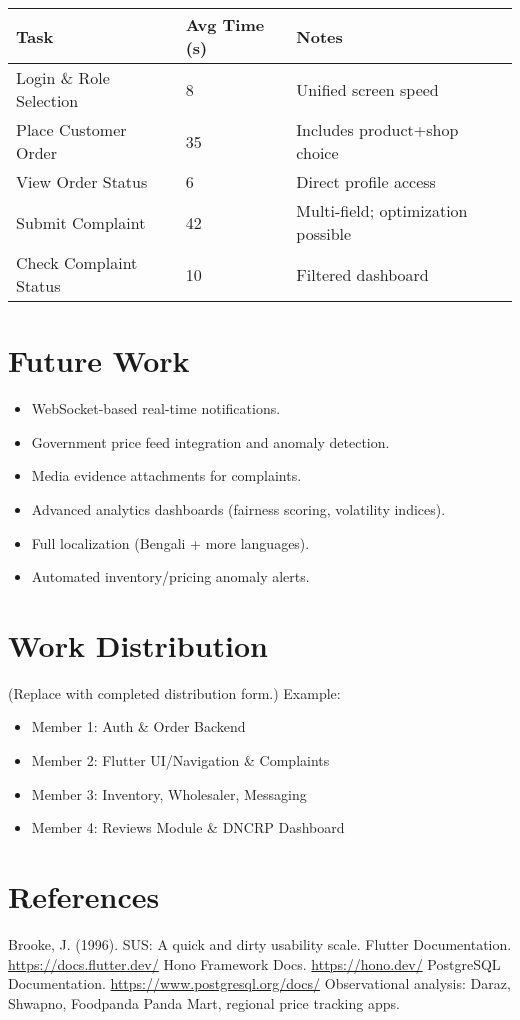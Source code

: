 \documentclass[12pt,a4paper]{article}
\begin{document}
\begin{table}[H]
\centering
\begin{tabular}{p{5cm} p{3cm} p{6cm}}
\toprule
Task & Avg Time (s) & Notes \\
\midrule
Login \& Role Selection & 8 & Unified screen speed \\
Place Customer Order & 35 & Includes product+shop choice \\
View Order Status & 6 & Direct profile access \\
Submit Complaint & 42 & Multi-field; optimization possible \\
Check Complaint Status & 10 & Filtered dashboard \\
\bottomrule
\end{tabular}
\end{table}

\section{Future Work}
\begin{itemize}
  \item WebSocket-based real-time notifications.
  \item Government price feed integration and anomaly detection.
  \item Media evidence attachments for complaints.
  \item Advanced analytics dashboards (fairness scoring, volatility indices).
  \item Full localization (Bengali + more languages).
  \item Automated inventory/pricing anomaly alerts.
\end{itemize}

\section{Work Distribution}
(Replace with completed distribution form.) Example:
\begin{itemize}
  \item Member 1: Auth \& Order Backend
  \item Member 2: Flutter UI/Navigation \& Complaints
  \item Member 3: Inventory, Wholesaler, Messaging
  \item Member 4: Reviews Module \& DNCRP Dashboard
\end{itemize}

\section{References}
\begin{thebibliography}{9}
 Brooke, J. (1996). SUS: A quick and dirty usability scale.
 Flutter Documentation. \url{https://docs.flutter.dev/}
 Hono Framework Docs. \url{https://hono.dev/}
 PostgreSQL Documentation. \url{https://www.postgresql.org/docs/}
 Observational analysis: Daraz, Shwapno, Foodpanda Panda Mart, regional price tracking apps.
\end{thebibliography}
\end{document}
